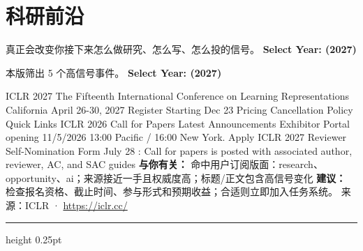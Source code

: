 \documentclass[10.5pt]{ctexart}
\begin{document}
\section*{科研前沿}
{\color{ormuted} 真正会改变你接下来怎么做研究、怎么写、怎么投的信号。}
\vspace{2mm}
{\LARGE\bfseries Select Year: (2027)}\par
\vspace{1mm}
{\color{ormuted} 本版筛出 5 个高信号事件。}
\vspace{3mm}
{\Large\bfseries Select Year: (2027)}\par
ICLR 2027 The Fifteenth International Conference on Learning Representations California April 26-30, 2027 Register Starting Dec 23 Pricing Cancellation Policy Quick Links ICLR 2026 Call for Papers Latest Announcements Exhibitor Portal opening 11/5/2026 13:00 Pacific / 16:00 New York. Apply ICLR 2027 Reviewer Self-Nomination Form July 28 : Call for papers is posted with associated author, reviewer, AC, and SAC guides 
\textbf{与你有关：} 命中用户订阅版面：research、opportunity、ai；来源接近一手且权威度高；标题/正文包含高信号变化
\textbf{建议：} 检查报名资格、截止时间、参与形式和预期收益；合适则立即加入任务系统。
{\footnotesize\color{ormuted} 来源：ICLR · \url{https://iclr.cc/}}
\vspace{4mm}
\hrule height 0.25pt
\vspace{3mm}
\end{document}
